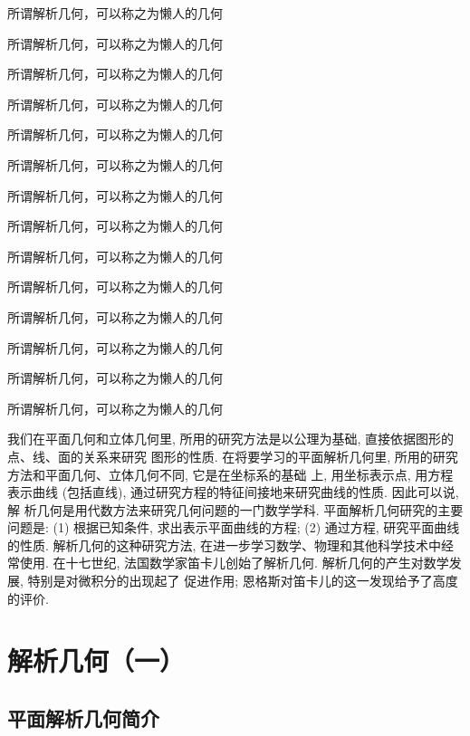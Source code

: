 所谓解析几何，可以称之为懒人的几何

所谓解析几何，可以称之为懒人的几何

所谓解析几何，可以称之为懒人的几何

所谓解析几何，可以称之为懒人的几何

所谓解析几何，可以称之为懒人的几何

所谓解析几何，可以称之为懒人的几何

所谓解析几何，可以称之为懒人的几何

所谓解析几何，可以称之为懒人的几何

所谓解析几何，可以称之为懒人的几何

所谓解析几何，可以称之为懒人的几何

所谓解析几何，可以称之为懒人的几何

所谓解析几何，可以称之为懒人的几何

所谓解析几何，可以称之为懒人的几何

所谓解析几何，可以称之为懒人的几何


我们在平面几何和立体几何里, 所用的研究方法是以公理为基础, 直接依据图形的点、线、面的关系来研究 图形的性质. 在将要学习的平面解析几何里, 所用的研究方法和平面几何、立体几何不同, 它是在坐标系的基础 上, 用坐标表示点, 用方程表示曲线 (包括直线), 通过研究方程的特征间接地来研究曲线的性质. 因此可以说, 解 析几何是用代数方法来研究几何问题的一门数学学科.
平面解析几何研究的主要问题是: (1) 根据已知条件, 求出表示平面曲线的方程; (2) 通过方程, 研究平面曲线的性质.
解析几何的这种研究方法, 在进一步学习数学、物理和其他科学技术中经常使用. 在十七世纪, 法国数学家笛卡儿创始了解析几何. 解析几何的产生对数学发展, 特别是对微积分的出现起了 促进作用; 恩格斯对笛卡儿的这一发现给予了高度的评价.
\chapter{解析几何（一）}
\section{平面解析几何简介}
